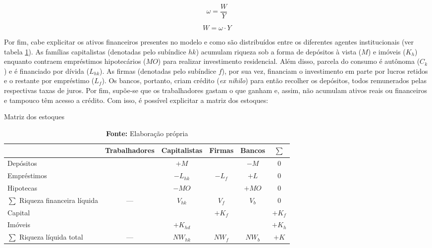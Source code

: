 
$$
\omega = \frac{W}{Y}
$$

\begin{equation}
\label{_W}
    W = \omega\cdot Y
\end{equation}

Por fim, cabe explicitar os ativos financeiros presentes no modelo e como são distribuídos entre os diferentes agentes institucionais (ver tabela \ref{Matriz_Estoques}). As famílias capitalistas (denotadas pelo subíndice $hk$) acumulam riqueza sob a forma de depósitos à vista ($M$) e imóveis ($K_h$) enquanto contraem empréstimos hipotecários ($MO$) para realizar investimento residencial.
Além disso, parcela do consumo é autônoma ($C_k$) e é financiado por dívida ($L_{hk}$).
As firmas (denotadas pelo subíndice $f$), por sua vez, financiam o investimento em parte por lucros retidos e o restante por empréstimo ($L_f$). Os bancos, portanto, criam crédito (\textit{ex nihilo}) para então recolher os depósitos, todos remunerados pelas respectivas taxas de juros. 
Por fim, supõe-se que os trabalhadores gastam o que ganham e, assim, não acumulam ativos reais ou financeiros e tampouco têm acesso a crédito.
Com isso, é possível explicitar a matriz dos estoques:


\begin{table}[H]
\centering
\caption{Matriz dos estoques}
\label{Matriz_Estoques}
\begin{tabular}{lccccc}
\hline
\hline


                          & Trabalhadores & Capitalistas      & Firmas        & Bancos  &    $\sum$ \\ \hline

Depósitos & & $+M$ & & $-M$ & 0\\
Empréstimos& &$-L_{hk}$ &$-L_f$& $+L$ & 0\\
Hipotecas & &$-MO$&  & $+MO$ & 0\\\hline
$\sum$ Riqueza financeira líquida &--- &$V_{hk}$&$V_f$&$V_b$& $0$\\\hline
Capital & & &$+K_f$&  & $+K_f$\\
Imóveis & &$+K_{hd}$& &   & $+K_h$\\\hline
$\sum$ Riqueza líquida total &---&$NW_{hk}$&$NW_f$&$NW_b$& $+K$\\
\hline
\hline
\end{tabular}%
\caption*{\textbf{Fonte:} Elaboração própria}
\end{table}

